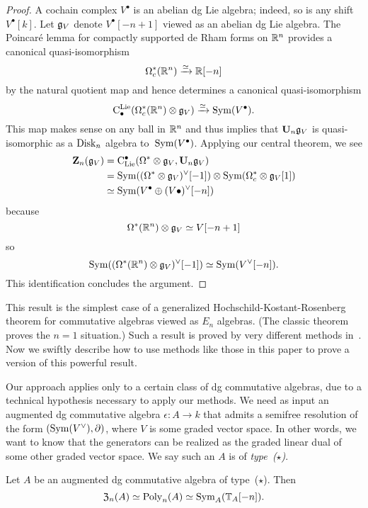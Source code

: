 \documentclass[11pt]{amsart}
\numberwithin{equation}{section}
\begin{document}
\begin{proof}
A cochain complex $V^\bullet$ is an abelian dg Lie algebra;
indeed, so is any shift $V^\bullet[k]$. 
Let $\mathfrak g_V$ denote $V^\bullet[-n+1]$ viewed as an abelian dg Lie algebra.
The Poincar\'e lemma for compactly supported de Rham forms on $\mathbb R^n$ provides a canonical quasi-isomorphism
\[
\Omega^*_c(\mathbb R^n) \xrightarrow{\simeq} \mathbb R[-n]
\]
by the natural quotient map and hence determines a canonical quasi-isomorphism
\[
{\rm C}^{\rm Lie}_\bullet(\Omega^*_c(\mathbb R^n) \otimes \mathfrak g_V) \xrightarrow{\simeq} {\rm Sym}(V^\bullet).
\]
This map makes sense on any ball in $\mathbb R^n$ and thus implies that $\mathbf U_n \mathfrak g_V$ is quasi-isomorphic as a ${\rm Disk}_n$ algebra to~${\rm Sym}(V^\bullet)$.
Applying our central theorem, we see
\begin{align*}
\mathbf Z_n(\mathfrak g_V) &= {\rm C}_{\rm Lie}^\bullet(\Omega^* \otimes \mathfrak g_V, \mathbf U_n \mathfrak g_V) \\
&= {\rm Sym}((\Omega^* \otimes \mathfrak g_V)^\vee[-1]) \otimes {\rm Sym}(\Omega^*_c \otimes \mathfrak g_V[1])\\
& \simeq {\rm Sym}(V^\bullet \oplus (V\bullet)^\vee[-n])
\end{align*}
because
\[
\Omega^*(\mathbb R^n) \otimes \mathfrak g_V \simeq V[-n+1]
\]
so
\[
{\rm Sym}( (\Omega^*(\mathbb R^n) \otimes \mathfrak g_V)^\vee[-1]) \simeq {\rm Sym}( V^\vee[-n]).
\]
This identification concludes the argument.
\end{proof}

This result is the simplest case of a generalized Hochschild-Kostant-Rosenberg theorem for commutative algebras viewed as $E_n$ algebras.
(The classic theorem proves the $n=1$ situation.)
Such a result is proved by very different methods in~\cite{CalWil}.
Now we swiftly describe how to use methods like those in this paper to prove a version of this powerful result.

Our approach applies only to a certain class of dg commutative algebras,
due to a technical hypothesis necessary to apply our methods.
We need as input an augmented dg commutative algebra $\epsilon: A \to k$ that admits a semifree resolution of the form $({\rm Sym}(V^\vee), \partial)$, where $V$ is some graded vector space.
In other words, we want to know that the generators can be realized as the graded linear dual of some other graded vector space.
We say such an $A$ is of {\em type~($\star$)}.

\begin{prp}
Let $A$ be an augmented dg commutative algebra of type~($\star$).
Then 
\[
{\frak Z}_n(A) \simeq {\rm Poly}_n(A) \simeq {\rm Sym}_A(\mathbb T_A[-n]).
\]
\end{prp}
\end{document}
